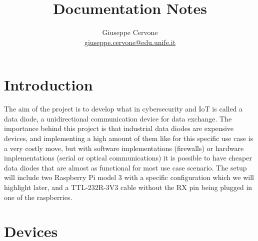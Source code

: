 \documentclass[a4paper,11pt]{scrartcl}
\title{Documentation Notes}
\date{}
\author{Giuseppe Cervone\\ \url{giuseppe.cervone@edu.unife.it}}
\begin{document}
\maketitle

\section{Introduction}
The aim of the project is to develop what in cybersecurity and IoT is called a data diode, a unidirectional communication device for data exchange. The importance behind this project is that industrial data diodes are expensive devices, and implementing a high amount of them like for this specific use case is a very costly move, but with software implementations (firewalls) or hardware implementations (serial or optical communications) it is possible to have cheaper data diodes that are almost as functional for most use case scenario. The setup will include two Raspberry Pi model 3 with a specific configuration which we will highlight later, and a TTL-232R-3V3 cable without the RX pin being plugged in one of the raspberries.

\section{Devices}
\end{document}
